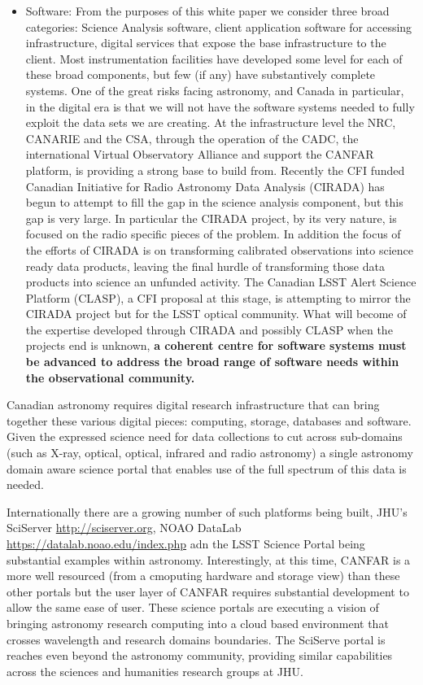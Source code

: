 \documentclass[11pt]{article}
\begin{document}
\begin{itemize}
    \item Software: From the purposes of this white paper we consider three broad categories: Science Analysis software, client application software for accessing infrastructure, digital services that expose the base infrastructure to the client.  Most instrumentation facilities have developed some level for each of these broad components, but few (if any) have substantively complete systems.  One of the great risks facing astronomy, and Canada in particular, in the digital era is that we  will not have the software systems needed to fully exploit the data sets we are creating.  At the infrastructure level the NRC, CANARIE and the CSA, through the operation of the CADC, the international Virtual Observatory Alliance and support the CANFAR platform, is providing a strong base to build from.  Recently the CFI funded Canadian Initiative for Radio Astronomy Data Analysis (CIRADA) has begun to attempt to fill the gap in the science analysis component, but this gap is very large.  In particular the CIRADA project, by its very nature, is focused on the radio specific pieces of the problem.  In addition the focus of the efforts of CIRADA is on transforming calibrated observations into science ready data products, leaving the final hurdle of transforming those data products into science an unfunded activity.  The Canadian LSST Alert Science Platform (CLASP), a CFI proposal at this stage, is attempting to mirror the CIRADA project but for the LSST optical community.  What will become of the expertise developed through CIRADA and possibly CLASP when the projects end is unknown, {\bf a coherent centre for software systems must be advanced to address the broad range of software needs within the observational community.}
\end{itemize}

Canadian astronomy requires digital research infrastructure that can bring together these various digital pieces:  computing, storage, databases and software.  Given the expressed science need for data collections to cut across sub-domains (such as X-ray, optical, optical, infrared and radio astronomy) a single astronomy domain aware science portal that enables use of the full spectrum of this data is needed.

Internationally there are a growing number of such platforms being built, JHU's SciServer \url{http://sciserver.org}, NOAO DataLab \url{https://datalab.noao.edu/index.php} adn the LSST Science Portal being substantial examples within astronomy.  
Interestingly, at this time, CANFAR is a more well resourced (from a cmoputing hardware and storage view) than these other portals but the user layer of CANFAR requires substantial development to allow the same ease of user.  
These science portals are executing a vision of bringing astronomy research computing into a cloud based environment that crosses wavelength and research domains boundaries. 
The SciServe portal is reaches even beyond the astronomy community, providing similar capabilities across the sciences and humanities research groups at JHU.
\end{document}
